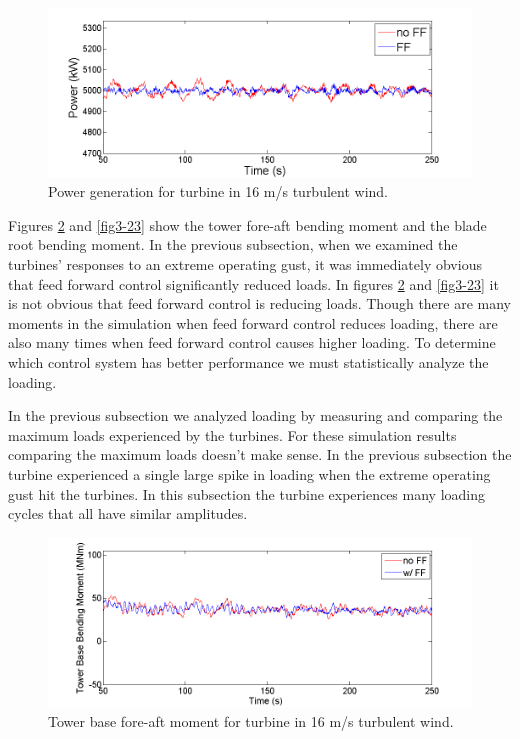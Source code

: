 \begin{figure}[htbp]
	\centering
		\includegraphics[width = \linewidth]{Figures/ch3Figures/fig3-21.png}
		
	\caption{Power generation for turbine in 16 m/s turbulent wind.}
	\label{fig3-21}
\end{figure}

Figures \ref{fig3-22} and \ref{fig3-23} show the tower fore-aft bending moment and the blade root bending moment. In the previous subsection, when we examined the turbines' responses to an extreme operating gust, it was immediately obvious that feed forward control significantly reduced loads. In figures \ref{fig3-22} and \ref{fig3-23} it is not obvious that feed forward control is reducing loads. Though there are many moments in the simulation when feed forward control reduces loading, there are also many times when feed forward control causes higher loading. To determine which control system has better performance we must statistically analyze the loading.

In the previous subsection we analyzed loading by measuring and comparing the maximum loads experienced by the turbines. For these simulation results comparing the maximum loads doesn't make sense. In the previous subsection the turbine experienced a single large spike in loading when the extreme operating gust hit the turbines. In this subsection the turbine experiences many loading cycles that all have similar amplitudes. 


\begin{figure}[htbp]
	\centering
		\includegraphics[width = \linewidth]{Figures/ch3Figures/fig3-22.png}
		
	\caption{Tower base fore-aft moment for turbine in 16 m/s turbulent wind.}
	\label{fig3-22}
\end{figure}

